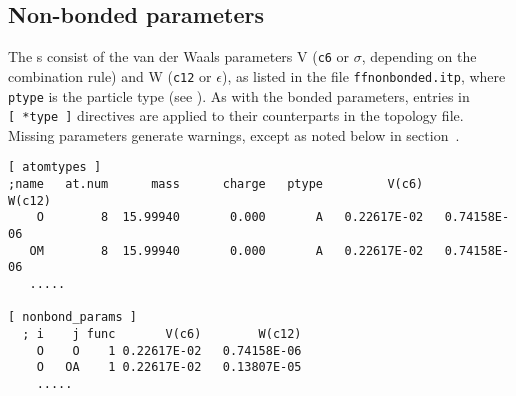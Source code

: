 
\subsection{Non-bonded parameters}
\label{subsec:nbpar}
The s consist of the van der Waals 
parameters V ({\tt c6} or $\sigma$, depending on the combination rule) and W 
({\tt c12} or $\epsilon$), as listed in the file {\tt ffnonbonded.itp}, where 
{\tt ptype} is the particle type (see ). As with the bonded parameters, entries in {\tt [~*type~]} directives 
are applied to their counterparts in the topology file.  Missing parameters 
generate warnings, except as noted below in section~.

{\small
\begin{verbatim}
[ atomtypes ]
;name   at.num      mass      charge   ptype         V(c6)        W(c12)
    O        8  15.99940       0.000       A   0.22617E-02   0.74158E-06
   OM        8  15.99940       0.000       A   0.22617E-02   0.74158E-06
   .....

[ nonbond_params ]
  ; i    j func       V(c6)        W(c12)
    O    O    1 0.22617E-02   0.74158E-06
    O   OA    1 0.22617E-02   0.13807E-05
    .....
\end{verbatim}}

